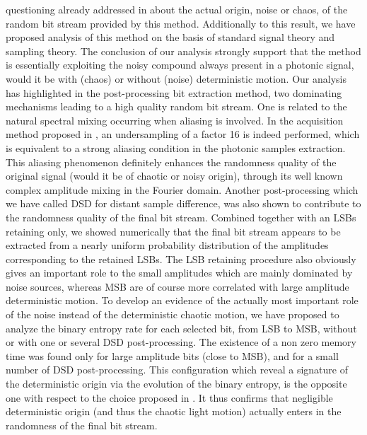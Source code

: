 questioning already addressed in \cite{williams:OE10,hirano:OE10}
about the actual origin, noise or chaos, of the random bit stream
provided by this method. Additionally to this result, we have proposed
analysis of this method on the basis of standard signal theory and
sampling theory. The conclusion of our analysis strongly support that
the method is essentially exploiting the noisy compound always present
in a photonic signal, would it be with (chaos) or without (noise)
deterministic motion. Our analysis has highlighted in the
post-processing bit extraction method, two dominating mechanisms
leading to a high quality random bit stream. One is related to the
natural spectral mixing occurring when aliasing is involved. In the
acquisition method proposed in \cite{ultrafast2009}, an undersampling
of a factor 16 is indeed performed, which is equivalent to a strong
aliasing condition in the photonic samples extraction. This aliasing
phenomenon definitely enhances the randomness quality of the original
signal (would it be of chaotic or noisy origin), through its well
known complex amplitude mixing in the Fourier domain. Another
post-processing which we have called DSD for distant sample
difference, was also shown to contribute to the randomness quality of
the final bit stream. Combined together with an LSBs retaining only,
we showed numerically that the final bit stream appears to be
extracted from a nearly uniform probability distribution of the
amplitudes corresponding to the retained LSBs. The LSB retaining
procedure also obviously gives an important role to the small
amplitudes which are mainly dominated by noise sources, whereas MSB
are of course more correlated with large amplitude deterministic
motion. To develop an evidence of the actually most important role of
the noise instead of the deterministic chaotic motion, we have
proposed to analyze the binary entropy rate for each selected bit,
from LSB to MSB, without or with one or several DSD
post-processing. The existence of a non zero memory time was found
only for large amplitude bits (close to MSB), and for a small number
of DSD post-processing. This configuration which reveal a signature of
the deterministic origin via the evolution of the binary entropy, is
the opposite one with respect to the choice proposed in
\cite{ultrafast2009}. It thus confirms that negligible deterministic
origin (and thus the chaotic light motion) actually enters in the
randomness of the final bit stream.

